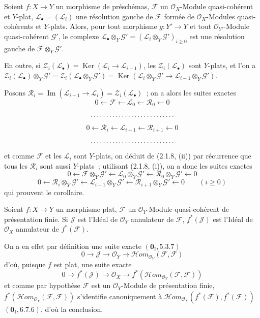 \begin{corollary}[2.1.10]
\label{IV.2.1.10-fr}
Soient $f:X\to Y$ un morphisme de préschémas, $\mathscr F$ un
$\mathcal O_X$-Module quasi-cohérent et $Y$-plat,
$\mathscr L_\bullet=(\mathscr L_i)$ une résolution gauche de $\mathscr F$
formée de $\mathcal O_X$-Modules quasi-cohérents et $Y$-plats. Alors, pour
tout morphisme $g:Y'\to Y$ et tout $\mathcal O_{Y'}$-Module quasi-cohérent
$\mathscr G'$, le complexe
$\mathscr L_\bullet\otimes_Y\mathscr G'=
(\mathscr L_i\otimes_Y\mathscr G')_{i\geq0}$ est une résolution gauche de
$\mathscr F\otimes_Y\mathscr G'$.

En outre, si
$\mathscr Z_i(\mathscr L_\bullet)=\operatorname{Ker}
(\mathscr L_i\to\mathscr L_{i-1})$, les $\mathscr Z_i(\mathscr L_\bullet)$
sont $Y$-plats, et l'on a
$\mathscr Z_i(\mathscr L_\bullet)\otimes_Y\mathscr G'
=\mathscr Z_i(\mathscr L_\bullet\otimes_Y\mathscr G')
=\operatorname{Ker}(\mathscr L_i\otimes_Y\mathscr G'
\to\mathscr L_{i-1}\otimes_Y\mathscr G')$.
\end{corollary}

Posons
$\mathscr R_i=\operatorname{Im}(\mathscr L_{i+1}\to\mathscr L_i)
=\mathscr Z_i(\mathscr L_\bullet)$~; on a alors les suites exactes
\[
0\leftarrow\mathscr F\leftarrow\mathscr L_0\leftarrow\mathscr R_0\leftarrow0
\]
\[
\hbox to 12em{\dotfill}
\]
\[
0\leftarrow\mathscr R_i\leftarrow\mathscr L_{i+1}
\leftarrow\mathscr R_{i+1}\leftarrow0
\]
\[
\hbox to 12em{\dotfill}
\]
et comme $\mathscr F$ et les $\mathscr L_i$ sont $Y$-plats, on déduit de
(2.1.8, (ii)) par récurrence que tous les $\mathscr R_i$ sont aussi
$Y$-plats~; utilisant (2.1.8, (i)), on a donc les suites exactes
\[
0\leftarrow\mathscr F\otimes_Y\mathscr G'
\leftarrow\mathscr L_0\otimes_Y\mathscr G'
\leftarrow\mathscr R_0\otimes_Y\mathscr G'\leftarrow0
\]
\[
0\leftarrow\mathscr R_i\otimes_Y\mathscr G'
\leftarrow\mathscr L_{i+1}\otimes_Y\mathscr G'
\leftarrow\mathscr R_{i+1}\otimes_Y\mathscr G'\leftarrow0
\qquad(i\geq0)
\]
qui prouvent le corollaire.

\begin{proposition}[2.1.11]
\label{IV.2.1.11-fr}
Soient $f:X\to Y$ un morphisme plat, $\mathscr F$ un $\mathcal O_Y$-Module
quasi-cohérent de présentation finie. Si $\mathscr J$ est l'Idéal de
$\mathcal O_Y$ annulateur de $\mathscr F$, $f^*(\mathscr J)$ est l'Idéal de
$\mathcal O_X$ annulateur de $f^*(\mathscr F)$.
\end{proposition}

On a en effet par définition une suite exacte $(\mathbf{0}_{\mathrm I},5.3.7)$
\[
0\to\mathscr J\to\mathcal O_Y\to
\mathscr H\!om_{\mathcal O_Y}(\mathscr F,\mathscr F)
\]
d'où, puisque $f$ est plat, une suite exacte
\[
0\to f^*(\mathscr J)\to\mathcal O_X\to
f^*(\mathscr H\!om_{\mathcal O_Y}(\mathscr F,\mathscr F))
\]
et comme par hypothèse $\mathscr F$ est un $\mathcal O_Y$-Module de
présentation finie,
$f^*(\mathscr H\!om_{\mathcal O_Y}(\mathscr F,\mathscr F))$ s'identifie
canoniquement à
$\mathscr H\!om_{\mathcal O_X}(f^*(\mathscr F),f^*(\mathscr F))$
$(\mathbf{0}_{\mathrm I},6.7.6)$, d'où la conclusion.

